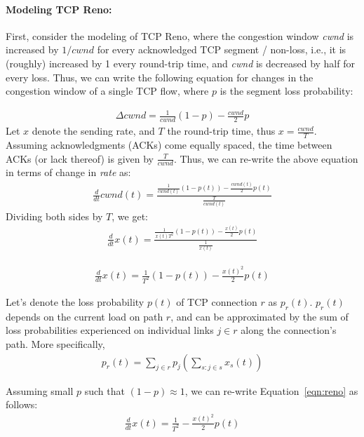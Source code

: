 \documentclass{article}
\begin{document}
\paragraph{Modeling TCP Reno:} First, consider the modeling of TCP Reno, where the congestion window {\em cwnd} is increased by $1/cwnd$ for every acknowledged TCP segment / non-loss, i.e., it is (roughly) increased by 1 every round-trip time, and {\em cwnd} is decreased by half for every loss. Thus, we can write the following equation for changes in the congestion window of a single TCP flow, where $p$ is the segment loss probability:

\begin{eqnarray*}
\Delta cwnd = \frac{1}{cwnd} (1-p) - \frac{cwnd}{2} p
\end{eqnarray*}
Let $x$ denote the sending rate, and $T$ the round-trip time, thus $x = \frac{cwnd}{T}$.
Assuming acknowledgments (ACKs) come equally spaced, 
the time between ACKs (or lack thereof) is given by $\frac{T}{cwnd}$.
Thus, we can re-write the above equation in terms of change in {\em rate} as:
\begin{eqnarray*}
\frac{d}{dt}  cwnd(t) = \frac{\frac{1}{cwnd(t)} (1-p(t)) - \frac{cwnd(t)}{2} p(t)}{\frac{T}{cwnd(t)}}
\end{eqnarray*}
Dividing both sides by $T$, we get:
\begin{eqnarray*}
\frac{d}{dt} x(t) = \frac{\frac{1}{x(t) T^2} (1-p(t)) - \frac{x(t)}{2} p(t)}{\frac{1}{x(t)}}
\end{eqnarray*}


\begin{eqnarray}
\frac{d}{dt} x(t) = \frac{1}{T^2} (1-p(t)) - \frac{{x(t)}^2}{2} p(t)
\label{eqn:reno}
\end{eqnarray}


Let's denote the loss probability $p(t)$ of TCP connection $r$ as $p_r(t)$.
$p_r(t)$ depends on the current load on path $r$,
and can be approximated by the sum of loss probabilities experienced on individual links $j \in r$ 
along the connection's path.
More specifically,
\begin{eqnarray*}
p_r(t) = \sum_{j \in r} p_j(\sum_{s: j \in s} x_s(t))
\end{eqnarray*}


Assuming small $p$ such that $(1-p) \approx 1$, we can re-write Equation~\ref{eqn:reno} as follows:
\begin{eqnarray*}
\frac{d}{dt} x(t) = \frac{1}{T^2}  - \frac{{x(t)}^2}{2} p(t)
\end{eqnarray*}
\end{document}
